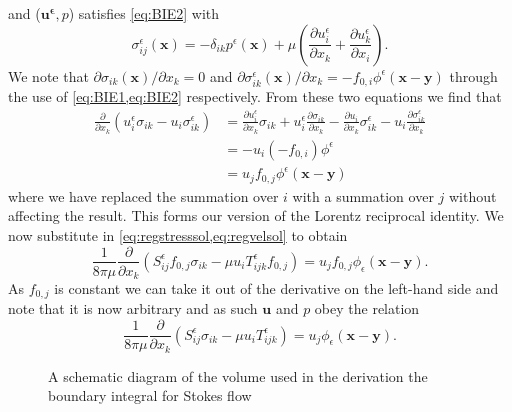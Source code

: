 and ($\bm{u^\epsilon},p$) satisfies \cref{eq:BIE2} with
\begin{equation*}
\sigma^\epsilon_{ij}(\bm{x}) = -\delta_{ik}p^\epsilon(\bm{x}) + \mu\left( \frac{\partial u^\epsilon_i}{\partial x_k} + \frac{\partial u^\epsilon_k}{\partial x_i} \right).
\end{equation*}
We note that $\partial \sigma_{ik}(\bm{x})/ \partial x_k = 0$ and $\partial \sigma^\epsilon_{ik}(\bm{x})/ \partial x_k = -f_{0,i}\phi^\epsilon(\bm{x}-\bm{y})$ through the use of \cref{eq:BIE1,eq:BIE2} respectively. From these two equations we find that
\begin{equation*}
\begin{aligned}
  \frac{\partial}{\partial x_k}(u^\epsilon_i\sigma_{ik} - u_i\sigma^\epsilon_{ik}) &=
  \frac{\partial u^\epsilon_i}{\partial x_k} \sigma_{ik} + u^\epsilon_i\frac{\partial \sigma_{ik}}{\partial x_k} - \frac{\partial u_i}{\partial x_k} \sigma^\epsilon_{ik} - u_i\frac{\partial \sigma^\epsilon_{ik}}{\partial x_k}  \\
  & = - u_i(-f_{0,i})\phi^\epsilon  \\
  &= u_j f_{0,j}\phi^\epsilon(\bm{x}-\bm{y})
\end{aligned}
\end{equation*}
where we have replaced the summation over $i$ with a summation over $j$ without affecting the result. This forms our version of the Lorentz reciprocal identity. We now substitute in \cref{eq:regstresssol,eq:regvelsol} to obtain
\begin{equation*}
  \frac{1}{8\pi\mu}\frac{\partial}{\partial x_k}(S^\epsilon_{ij}f_{0,j}\sigma_{ik} - \mu u_i T^\epsilon_{ijk}f_{0,j}) = u_j f_{0,j}\phi_\epsilon(\bm{x}-\bm{y}).
\end{equation*}
As $f_{0,j}$ is constant we can take it out of the derivative on the left-hand side and note that it is now arbitrary and as such $\bm{u}$ and $p$ obey the relation
\begin{equation}
  \label{eq:reciprocalrelation}
  \frac{1}{8\pi\mu}\frac{\partial}{\partial x_k}(S^\epsilon_{ij}\sigma_{ik} - \mu u_i T^\epsilon_{ijk}) = u_j\phi_\epsilon(\bm{x}-\bm{y}).
\end{equation}

\begin{figure}[ht]
    \centering
    \resizebox{.3\linewidth}{!}{}
    \caption{A schematic diagram of the volume used in the derivation the boundary integral for Stokes flow}
    \label{fig:SystematicDiagram}
\end{figure}


